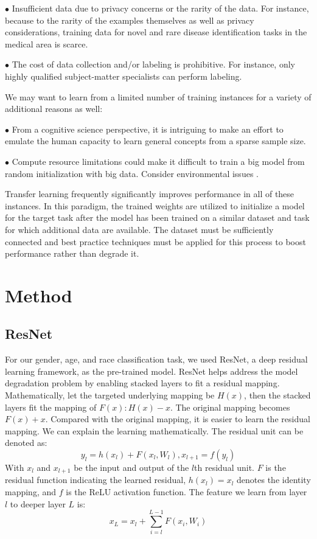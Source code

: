 \documentclass[DIV=calc, paper=a4, fontsize=10pt, twocolumn]{article}
\begin{document}
	$\bullet$ Insufficient data due to privacy concerns or the rarity of the data. For instance, because to the rarity of the examples themselves as well as privacy considerations, training data for novel and rare disease identification tasks in the medical area is scarce. 
	
	$\bullet$ The cost of data collection and/or labeling is prohibitive. For instance, only highly qualified subject-matter specialists can perform labeling.
	
	We may want to learn from a limited number of training instances for a variety of additional reasons as well: 
	
	$\bullet$ From a cognitive science perspective, it is intriguing to make an effort to emulate the human capacity to learn general concepts from a sparse sample size. 
	
	$\bullet$ Compute resource limitations could make it difficult to train a big model from random initialization with big data. Consider environmental issues \cite{strubell2019energy}. 
	
	Transfer learning frequently significantly improves performance in all of these instances. In this paradigm, the trained weights are utilized to initialize a model for the target task after the model has been trained on a similar dataset and task for which additional data are available. The dataset must be sufficiently connected and best practice techniques must be applied for this process to boost performance rather than degrade it.
	
	\section{Method}
	\subsection{ResNet}
	For our gender, age, and race classification task, we used ResNet, a deep residual learning framework, as the pre-trained model. ResNet\cite{he2016deep} helps address the model degradation problem by enabling stacked layers to fit a residual mapping. Mathematically, let the targeted underlying mapping be $H(x)$, then the stacked layers fit the mapping of $F(x): H(x)-x$. The original mapping becomes $F(x)+x$. Compared with the original mapping, it is easier to  learn the residual mapping. We can explain the learning mathematically. The residual unit can be denoted as: 
	$$
	y_l=h(x_l)+F(x_l, W_l),
	x_{l+1}=f(y_l)
	$$
	With $x_l$ and $x_{l+1}$ be the input and output of the $l$th residual unit. $F$ is the residual function indicating the learned residual, $h(x_l)=x_l$ denotes the identity mapping, and $f$ is the ReLU activation function. The feature we learn from layer $l$ to deeper layer $L$ is:
	$$
	x_L=x_l+\sum_{i=l}^{L-1}F(x_i, W_i)
	$$
	
\end{document}
